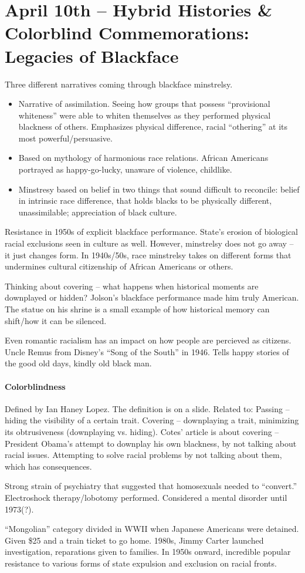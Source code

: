 \section{April 10th -- Hybrid Histories \& Colorblind Commemorations: Legacies of Blackface}

Three different narratives coming through blackface minstrelsy.

\begin{itemize}
	\item Narrative of assimilation. Seeing how groups that possess ``provisional whiteness'' were able to whiten themselves as they performed physical blackness of others. Emphasizes physical difference, racial ``othering'' at its most powerful/persuasive.
	\item Based on mythology of harmonious race relations. African Americans portrayed as happy-go-lucky, unaware of violence, childlike.
	\item Minstresy based on belief in two things that sound difficult to reconcile: belief in intrinsic race difference, that holds blacks to be physically different, unassimilable; appreciation of black culture.
\end{itemize}

Resistance in 1950s of explicit blackface performance. State's erosion of biological racial exclusions seen in culture as well. However, minstrelsy does not go away -- it just changes form. In 1940s/50s, race minstrelsy takes on different forms that undermines cultural citizenship of African Americans or others.

Thinking about covering -- what happens when historical moments are downplayed or hidden? Jolson's blackface performance made him truly American. The statue on his shrine is a small example of how historical memory can shift/how it can be silenced.

Even romantic racialism has an impact on how people are percieved as citizens. Uncle Remus from Disney's ``Song of the South'' in 1946. Tells happy stories of the good old days, kindly old black man.

\paragraph{Colorblindness} Defined by Ian Haney Lopez. The definition is on a slide. Related to: Passing -- hiding the visibility of a certain trait. Covering -- downplaying a trait, minimizing its obtrusiveness (downplaying vs. hiding). Cotes' article is about covering -- President Obama's attempt to downplay his own blackness, by not talking about racial issues. Attempting to solve racial problems by not talking about them, which has consequences.

Strong strain of psychiatry that suggested that homosexuals needed to ``convert.'' Electroshock therapy/lobotomy performed. Considered a mental disorder until 1973(?).

``Mongolian'' category divided in WWII when Japanese Americans were detained. Given \$25 and a train ticket to go home. 1980s, Jimmy Carter launched investigation, reparations given to families. In 1950s onward, incredible popular resistance to various forms of state expulsion and exclusion on racial fronts.